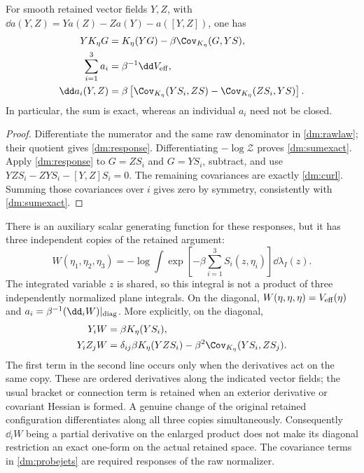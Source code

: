 \begin{proposition}
\label{dm:curvatureprop}
For smooth retained vector fields \(Y,Z\), with
\(\dd a(Y,Z)=Ya(Z)-Za(Y)-a([Y,Z])\), one has
\begin{align}
 YK_\eta G&=K_\eta(YG)-\beta\Cov_{K_\eta}(G,YS),
 \label{dm:response}\\
 \sum_{i=1}^3a_i&=\beta^{-1}\dd V_{\rm eff},
 \label{dm:sumexact}\\
 \dd a_i(Y,Z)&=\beta\left[
   \Cov_{K_\eta}(YS_i,ZS)
  -\Cov_{K_\eta}(ZS_i,YS)\right].
 \label{dm:curl}
\end{align}
In particular, the sum is exact, whereas an individual \(a_i\) need not be closed.
\end{proposition}
\begin{proof}
Differentiate the numerator and the same raw denominator in \eqref{dm:rawlaw}; their quotient gives \eqref{dm:response}. Differentiating \(-\log\mathcal Z\) proves \eqref{dm:sumexact}. Apply \eqref{dm:response} to \(G=ZS_i\) and \(G=YS_i\), subtract, and use
\(YZS_i-ZYS_i-[Y,Z]S_i=0\). The remaining covariances are exactly \eqref{dm:curl}. Summing those covariances over \(i\) gives zero by symmetry, consistently with \eqref{dm:sumexact}.
\end{proof}

There is an auxiliary scalar generating function for these responses, but it has three independent copies of the retained argument:
\begin{equation}
 W(\eta_1,\eta_2,\eta_3)
 =-\log\int\exp\left[-\beta\sum_{i=1}^3S_i(z,\eta_i)\right]
                 \dd\lambda_I(z).
 \label{dm:probe}
\end{equation}
The integrated variable \(z\) is shared, so this integral is not a product of three independently normalized plane integrals. On the diagonal, \(W(\eta,\eta,\eta)=V_{\rm eff}(\eta)\) and
\(a_i=\beta^{-1}(\dd_iW)|_{\rm diag}\). More explicitly, on the diagonal,
\begin{align}
 Y_i W&=\beta K_\eta(YS_i),\notag\\
 Y_iZ_jW
 &=\delta_{ij}\beta K_\eta(YZS_i)
       -\beta^2\Cov_{K_\eta}(YS_i,ZS_j).
 \label{dm:probejets}
\end{align}
The first term in the second line occurs only when the derivatives act on the same copy. These are ordered derivatives along the indicated vector fields; the usual bracket or connection term is retained when an exterior derivative or covariant Hessian is formed. A genuine change of the original retained configuration differentiates along all three copies simultaneously. Consequently \(\dd_iW\) being a partial derivative on the enlarged product does not make its diagonal restriction an exact one-form on the actual retained space. The covariance terms in \eqref{dm:probejets} are required responses of the raw normalizer.

